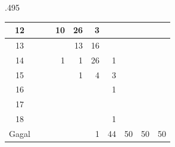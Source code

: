 \begin{table}
\begin{subtable}{.495\linewidth}
{\begin{tabular}{|c|lllllllll|}
			12                                                                             & \multicolumn{1}{r|}{}   & \multicolumn{1}{r|}{}   & \multicolumn{1}{r|}{10} & \multicolumn{1}{r|}{26} & \multicolumn{1}{r|}{3}  & \multicolumn{1}{r|}{}   & \multicolumn{1}{r|}{}   & \multicolumn{1}{r|}{}   &                         \\ \hline
			13                                                                             & \multicolumn{1}{r|}{}   & \multicolumn{1}{r|}{}   & \multicolumn{1}{r|}{}   & \multicolumn{1}{r|}{13} & \multicolumn{1}{r|}{16} & \multicolumn{1}{r|}{}   & \multicolumn{1}{r|}{}   & \multicolumn{1}{r|}{}   &                         \\ \hline
			14                                                                             & \multicolumn{1}{r|}{}   & \multicolumn{1}{r|}{}   & \multicolumn{1}{r|}{1}  & \multicolumn{1}{r|}{1}  & \multicolumn{1}{r|}{26} & \multicolumn{1}{r|}{1}  & \multicolumn{1}{r|}{}   & \multicolumn{1}{r|}{}   &                         \\ \hline
			15                                                                             & \multicolumn{1}{r|}{}   & \multicolumn{1}{r|}{}   & \multicolumn{1}{r|}{}   & \multicolumn{1}{r|}{1}  & \multicolumn{1}{r|}{4}  & \multicolumn{1}{r|}{3}  & \multicolumn{1}{r|}{}   & \multicolumn{1}{r|}{}   &                         \\ \hline
			16                                                                             & \multicolumn{1}{r|}{}   & \multicolumn{1}{r|}{}   & \multicolumn{1}{r|}{}   & \multicolumn{1}{r|}{}   & \multicolumn{1}{r|}{}   & \multicolumn{1}{r|}{1}  & \multicolumn{1}{r|}{}   & \multicolumn{1}{r|}{}   &                         \\ \hline
			17                                                                             & \multicolumn{1}{r|}{}   & \multicolumn{1}{r|}{}   & \multicolumn{1}{r|}{}   & \multicolumn{1}{r|}{}   & \multicolumn{1}{r|}{}   & \multicolumn{1}{r|}{}   & \multicolumn{1}{r|}{}   & \multicolumn{1}{r|}{}   &                         \\ \hline
			18                                                                             & \multicolumn{1}{r|}{}   & \multicolumn{1}{r|}{}   & \multicolumn{1}{r|}{}   & \multicolumn{1}{r|}{}   & \multicolumn{1}{r|}{}   & \multicolumn{1}{r|}{1}  & \multicolumn{1}{r|}{}   & \multicolumn{1}{r|}{}   &                         \\ \hline
			Gagal                                                                          & \multicolumn{1}{r|}{}   & \multicolumn{1}{r|}{}   & \multicolumn{1}{r|}{}   & \multicolumn{1}{r|}{}   & \multicolumn{1}{r|}{1}  & \multicolumn{1}{r|}{44} & \multicolumn{1}{r|}{50} & \multicolumn{1}{r|}{50} & 50                      \\ \hline
			\end{tabular}
		}
	\end{subtable}


\end{table}
